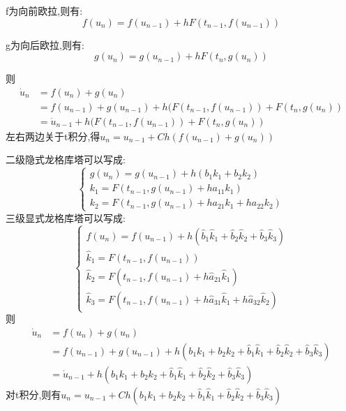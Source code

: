 \documentclass[12pt,a4paper]{article}
\begin{document}
f为向前欧拉,则有:
\begin{equation}
f(u_{n})=f(u_{n-1})+hF(t_{n-1},f(u_{n-1}))
\end{equation}

g为向后欧拉,则有:
\begin{equation}
g(u_{n})=g(u_{n-1})+hF(t_{n},g(u_{n}))
\end{equation}

则
\begin{align}
\dot{u}_{n}&=f(u_{n})+g(u_{n})\\&=f(u_{n-1})+g(u_{n-1})+h(F(t_{n-1},f(u_{n-1}))+F(t_{n},g(u_{n}))\\&=\dot{u}_{n-1}+h(F(t_{n-1},f(u_{n-1}))+F(t_{n},g(u_{n}))
\end{align}
左右两边关于t积分,得$u_{n}=u_{n-1}+Ch(f(u_{n-1})+g(u_{n}))$

二级隐式龙格库塔可以写成:
\begin{equation}
\begin{cases}
g(u_{n})=g(u_{n-1})+h(b_{1}k_{1}+b_{2}k_{2})\\
k_{1}=F(t_{n-1},g(u_{n-1})+ha_{11}k_{1})\\
k_{2}=F(t_{n-1},g(u_{n-1})+ha_{21}k_{1}+ha_{22}k_{2})
\end{cases}
\end{equation}
三级显式龙格库塔可以写成:
\begin{equation}
\begin{cases}
f(u_{n})=f(u_{n-1})+h(\hat{b}_{1}\hat{k}_{1}+\hat{b}_{2}\hat{k}_{2}+\hat{b}_{3}\hat{k}_{3})\\
\hat{k}_{1}=F(t_{n-1},f(u_{n-1}))\\
\hat{k}_{2}=F(t_{n-1},f(u_{n-1})+h\hat{a}_{21}\hat{k}_{1})\\
\hat{k}_{3}=F(t_{n-1},f(u_{n-1})+h\hat{a}_{31}\hat{k}_{1}+h\hat{a}_{32}\hat{k}_{2})
\end{cases}
\end{equation}
则
\begin{align}
\dot{u}_{n}&=f(u_{n})+g(u_{n})\\
&=f(u_{n-1})+g(u_{n-1})+h(b_{1}k_{1}+b_{2}k_{2}+\hat{b}_{1}\hat{k}_{1}+\hat{b}_{2}\hat{k}_{2}+\hat{b}_{3}\hat{k}_{3})\\&
=\dot{u}_{n-1}+h(b_{1}k_{1}+b_{2}k_{2}+\hat{b}_{1}\hat{k}_{1}+\hat{b}_{2}\hat{k}_{2}+\hat{b}_{3}\hat{k}_{3})
\end{align}
对t积分,则有${u}_{n}=u_{n-1}+Ch(b_{1}k_{1}+b_{2}k_{2}+\hat{b}_{1}\hat{k}_{1}+\hat{b}_{2}\hat{k}_{2}+\hat{b}_{3}\hat{k}_{3})$
\end{document}
